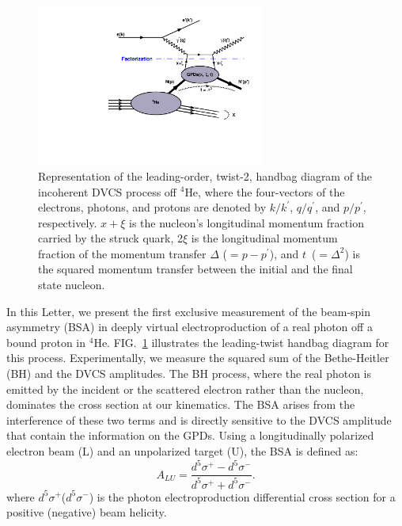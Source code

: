 \documentclass[twocolumn,nofootinbib,showpacs,prl,superscriptaddress,secnumarabic,amssymb,nobibnotes,aps,floatfix]{revtex4}
\begin{document}
\begin{figure}[tb]
\includegraphics[width=7.5cm]{figs/handbag_incoherent.pdf}
\caption{Representation of the leading-order, twist-2, handbag diagram of the 
   incoherent DVCS process off $^4$He, where the four-vectors of the electrons, 
   photons, and protons are denoted by $k/k^\prime$, $q/q^\prime$, and 
   $p/p^\prime$, respectively. $x+\xi$ is the nucleon’s longitudinal momentum 
   fraction carried by the struck quark, 2$\xi$ is the longitudinal momentum 
   fraction of the momentum transfer $\Delta$ ($= p - p^\prime$), and 
   $t$~($=\Delta^2$) is the squared momentum transfer between the initial and
   the final state nucleon.}
\label{fig:diags}
\end{figure}

In this Letter, we present the first exclusive measurement of the beam-spin 
asymmetry (BSA) in deeply virtual electroproduction of a real photon off a bound 
proton in $^{4}$He. FIG.~\ref{fig:diags} illustrates the 
leading-twist handbag diagram for this process. Experimentally, we measure the squared sum of the 
Bethe-Heitler (BH) and the DVCS amplitudes. The BH process, 
where the real photon is emitted by the incident or the scattered electron 
rather than the nucleon, dominates the cross section at our kinematics. The BSA arises from the interference 
of these two terms and is directly sensitive to the DVCS amplitude that contain 
the information on the GPDs. Using a longitudinally polarized electron beam 
(L) and an unpolarized target (U), the BSA is defined as:
\begin{equation}
  A_{LU} = \frac{d^{5}\sigma^{+} - d^{5}\sigma^{-} }
                {d^{5}\sigma^{+} + d^{5}\sigma^{-}}.
    \label{BSA_equation}
  \end{equation}
where $d^{5}\sigma^{+}$($d^{5}\sigma^{-}$) is the photon electroproduction 
differential cross section for a positive (negative) beam helicity. 
\end{document}
